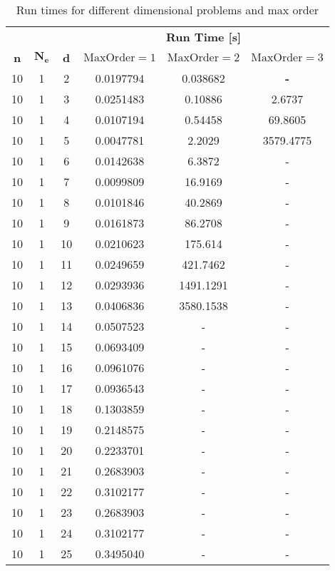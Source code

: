 \documentclass[a4paper]{article}      %
\begin{document}
\begin{table}[H]
  \caption{Run times for different dimensional problems and max order}
  \label{tab:runtime}
  \centering
  \begin{tabular}{cccccc}
     \toprule
	   &  &  &\multicolumn{3}{c}{\textbf{Run Time [s]}} \\
	 \cmidrule(lr){4-6}
	 \textbf{n} & $\mathbf{N_e}$ &\textbf{d} & $\mathrm{MaxOrder} = 1$ & $\mathrm{MaxOrder} = 2$ & $\mathrm{MaxOrder} = 3$ \\
	 \midrule
     10 & 1 &2 & 0.0197794 & 0.038682 & \textbf{-}\\
     10 & 1 &3 & 0.0251483 & 0.10886 & 2.6737 \\
     10 & 1 &4 & 0.0107194 & 0.54458 & 69.8605\\
     10 & 1 &5 & 0.0047781 & 2.2029 & 3579.4775\\  
     10 & 1 &6 & 0.0142638 & 6.3872 & -\\
     10 & 1 &7 & 0.0099809 & 16.9169 & -\\
     10 & 1 &8 & 0.0101846 & 40.2869 & -\\
     10 & 1 &9 & 0.0161873 & 86.2708 & -\\
     10 & 1 &10 & 0.0210623 & 175.614 & -\\
     10 & 1 &11 & 0.0249659 & 421.7462 & -\\
     10 & 1 &12 & 0.0293936 & 1491.1291 & -\\
     10 & 1 &13 & 0.0406836 & 3580.1538 & -\\
     10 & 1 &14 & 0.0507523 & - & -\\
     10 & 1 &15 & 0.0693409 & - & -\\
     10 & 1 &16 & 0.0961076 & - & -\\
     10 & 1 &17 & 0.0936543 & - & -\\
     10 & 1 &18 & 0.1303859 & - & -\\
     10 & 1 &19 & 0.2148575 & - & -\\
     10 & 1 &20 & 0.2233701 & - & -\\
     10 & 1 &21 & 0.2683903 & - & -\\
     10 & 1 &22 & 0.3102177 & - & -\\
     10 & 1 &23 & 0.2683903 & - & -\\
     10 & 1 &24 & 0.3102177 & - & -\\
     10 & 1 &25 & 0.3495040 & - & -\\
    \bottomrule
  \end{tabular}
\end{table}
\end{document}
